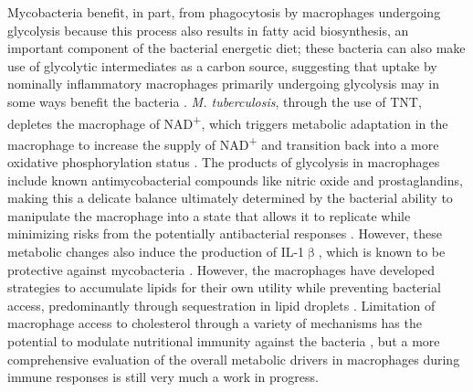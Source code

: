 Mycobacteria benefit, in part, from phagocytosis by macrophages undergoing glycolysis because this process also results in fatty acid biosynthesis, an important component of the bacterial energetic diet; these bacteria can also make use of glycolytic intermediates as a carbon source, suggesting that uptake by nominally inflammatory macrophages primarily undergoing glycolysis may in some ways benefit the bacteria \citep{Escoll2019, Mehrotra2014, Shi2019}. \textit{M. tuberculosis}, through the use of TNT, depletes the macrophage of NAD\textsuperscript{+}, which triggers metabolic adaptation in the macrophage to increase the supply of NAD\textsuperscript{+} and transition back into a more oxidative phosphorylation status \citep{Howard2020}. The products of glycolysis in macrophages include known antimycobacterial compounds like nitric oxide and prostaglandins, making this a delicate balance ultimately determined by the bacterial ability to manipulate the macrophage into a state that allows it to replicate while minimizing risks from the potentially antibacterial responses \citep{OsadaOka2019}. However, these metabolic changes also induce the production of IL\hyp{}1$\upbeta$, which is known to be protective against mycobacteria \citep{Corcoran2016, Ogryzko2019, Fremond2007, Shi2019}. However, the macrophages have developed strategies to accumulate lipids for their own utility while preventing bacterial access, predominantly through sequestration in lipid droplets \citep{Laval2021}. Limitation of macrophage access to cholesterol through a variety of mechanisms has the potential to modulate nutritional immunity against the bacteria \citep{Babunovic2022, Pandey2008, Yang2014c}, but a more comprehensive evaluation of the overall metabolic drivers in macrophages during immune responses is still very much a work in progress.
 
